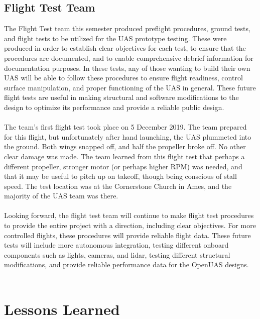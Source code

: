 \documentclass{article}
\begin{document}
\subsection{Flight Test Team}
The Flight Test team this semester produced preflight procedures, ground tests, and flight tests to be utilized for the UAS prototype testing. These were produced in order to establish clear objectives for each test, to ensure that the procedures are documented, and to enable comprehensive debrief information for documentation purposes. In these tests, any of those wanting to build their own UAS will be able to follow these procedures to ensure flight readiness, control surface manipulation, and proper functioning of the UAS in general. These future flight tests are useful in making structural and software modifications to the design to optimize its performance and provide a reliable public design. \\\\
The team's first flight test took place on 5 December 2019. The team prepared for this flight, but unfortunately after hand launching, the UAS plummeted into the ground. Both wings snapped off, and half the propeller broke off. No other clear damage was made. The team learned from this flight test that perhaps a different propeller, stronger motor (or perhaps higher RPM) was needed, and that it may be useful to pitch up on takeoff, though being conscious of stall speed. The test location was at the Cornerstone Church in Ames, and the majority of the UAS team was there. \\\\
Looking forward, the flight test team will continue to make flight test procedures to provide the entire project with a direction, including clear objectives. For more controlled flights, these procedures will provide reliable flight data. These future tests will include more autonomous integration, testing different onboard components such as lights, cameras, and lidar, testing different structural modifications, and provide reliable performance data for the OpenUAS designs. \\\\


\section{Lessons Learned}
\end{document}
